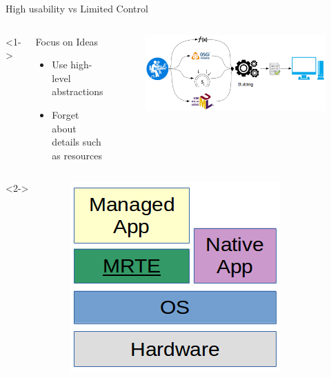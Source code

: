 \documentclass[10pt,xcolor={dvipsnames}]{beamer}
\begin{document}
	\begin{frame}{High usability vs Limited Control}
			\begin{columns}<1->
				\begin{scriptsize}
					\begin{block}{Focus on Ideas}
						\begin{itemize}
							\item Use high-level abstractions
							\item Forget about details such as resources
						\end{itemize}
					\end{block}
				\end{scriptsize}
					\begin{figure}
						\centering
						\includegraphics[scale=0.3]{fig/high-level.png}
					\end{figure}
			\end{columns}
			\begin{columns}<2->
				\column{0.3\textwidth}
					\begin{figure}
						\centering
						\includegraphics[scale=0.3]{fig/software-stack.png}
					\end{figure}
				  

\end{columns}
\end{frame}
\end{document}
